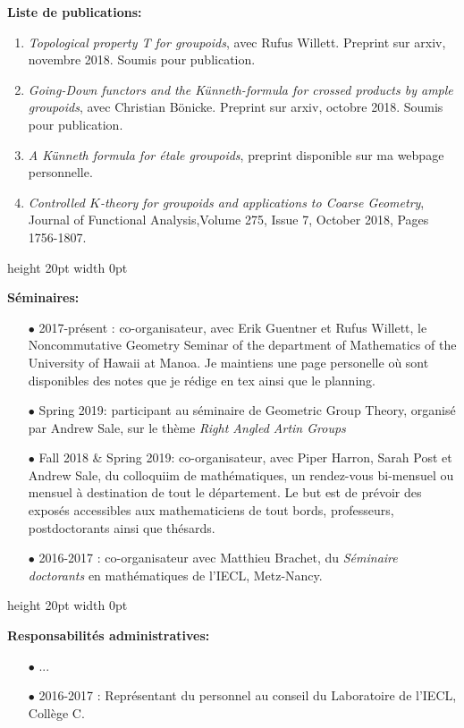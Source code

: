 \documentclass[a4paper,11pt]{article}
\newcommand\espace{\vrule height 20pt width 0pt}
\begin{document}
\textbf{Liste de publications:} 
\begin{enumerate}
\item \textit{Topological property T for groupoids}, avec Rufus Willett. Preprint sur arxiv, novembre 2018. Soumis pour publication.
\item \textit{Going-Down functors and the Künneth-formula for crossed products by ample groupoids}, avec Christian Bönicke. Preprint sur arxiv, octobre 2018. Soumis pour publication.
\item \textit{A K\"{u}nneth formula for \'etale groupoids}, preprint disponible sur ma webpage personnelle.
\item \textit{Controlled $K$-theory for groupoids and applications to Coarse Geometry}, Journal of Functional Analysis,Volume 275, Issue 7, October 2018, Pages 1756-1807. 
\end{enumerate}

\espace

\textbf{S\'eminaires:} \\

\begin{itemize}
\item[$\bullet$] 2017-pr\'esent : co-organisateur, avec Erik Guentner et Rufus Willett, le Noncommutative Geometry Seminar of the department of Mathematics of the University of Hawaii at Manoa. Je maintiens une page personelle o\`u sont disponibles des notes que je r\'edige en tex ainsi que le planning.\\
\item[$\bullet$] Spring 2019: participant au s\'eminaire de Geometric Group Theory, organis\'e par Andrew Sale, sur le th\`eme \textit{Right Angled Artin Groups}  \\
\item[$\bullet$] Fall 2018 \& Spring 2019: co-organisateur, avec Piper Harron, Sarah Post et Andrew Sale, du colloquiim de math\'ematiques, un rendez-vous bi-mensuel ou mensuel \`a destination de tout le d\'epartement. Le but est de pr\'evoir des expos\'es accessibles aux mathematiciens de tout bords, professeurs, postdoctorants ainsi que th\'esards.\\
\item[$\bullet$] 2016-2017 : co-organisateur avec Matthieu Brachet, du \textit{S\'eminaire doctorants} en math\'ematiques de l'IECL, Metz-Nancy.
\end{itemize}

\espace

\textbf{Responsabilit\'es administratives:} \\
\begin{itemize}
\item[$\bullet$] ... \\
\item[$\bullet$] 2016-2017 : Représentant du personnel au conseil du Laboratoire de l'IECL, Collège C.\\
\end{itemize}
\end{document}
